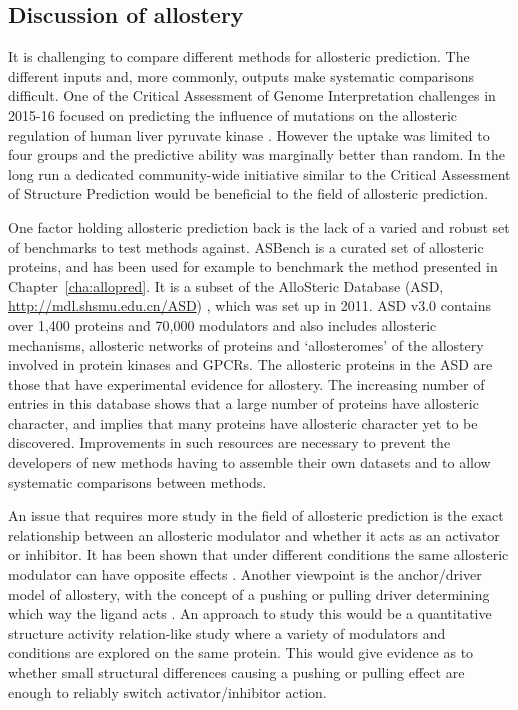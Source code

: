 \subsection{Discussion of allostery}

It is challenging to compare different methods for allosteric prediction.
The different inputs and, more commonly, outputs make systematic comparisons difficult.
One of the Critical Assessment of Genome Interpretation challenges in 2015-16 focused on predicting the influence of mutations on the allosteric regulation of human liver pyruvate kinase \cite{Xu2017}.
However the uptake was limited to four groups and the predictive ability was marginally better than random.
In the long run a dedicated community-wide initiative similar to the Critical Assessment of Structure Prediction \cite{Moult2016} would be beneficial to the field of allosteric prediction.

One factor holding allosteric prediction back is the lack of a varied and robust set of benchmarks to test methods against.
ASBench \cite{Huang2015} is a curated set of allosteric proteins, and has been used for example to benchmark the method presented in Chapter~\ref{cha:allopred}.
It is a subset of the AlloSteric Database (ASD, \url{http://mdl.shsmu.edu.cn/ASD}) \cite{Shen2016}, which was set up in 2011.
ASD v3.0 contains over 1,400 proteins and 70,000 modulators and also includes allosteric mechanisms, allosteric networks of proteins and `allosteromes' of the allostery involved in protein kinases and GPCRs.
The allosteric proteins in the ASD are those that have experimental evidence for allostery.
The increasing number of entries in this database shows that a large number of proteins have allosteric character, and implies that many proteins have allosteric character yet to be discovered.
Improvements in such resources are necessary to prevent the developers of new methods having to assemble their own datasets \cite{Panjkovich2012, Mitternacht2011, Amor2016} and to allow systematic comparisons between methods.

An issue that requires more study in the field of allosteric prediction is the exact relationship between an allosteric modulator and whether it acts as an activator or inhibitor.
It has been shown that under different conditions the same allosteric modulator can have opposite effects \cite{Motlagh2012}.
Another viewpoint is the anchor/driver model of allostery, with the concept of a pushing or pulling driver determining which way the ligand acts \cite{Nussinov2014}.
An approach to study this would be a quantitative structure activity relation-like study where a variety of modulators and conditions are explored on the same protein.
This would give evidence as to whether small structural differences causing a pushing or pulling effect are enough to reliably switch activator/inhibitor action.

